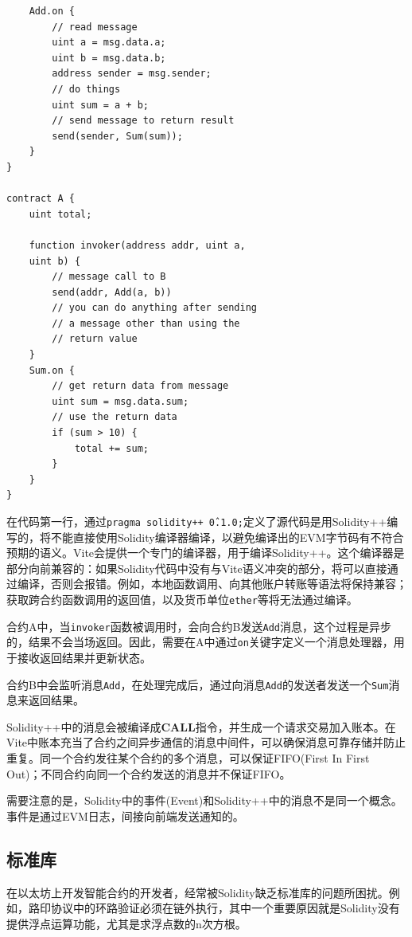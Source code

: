 \documentclass[UTF8,nofonts]{ctexart}
\begin{document}
\begin{multicols}{2}
\begin{verbatim}
    Add.on {
        // read message
        uint a = msg.data.a;
        uint b = msg.data.b;
        address sender = msg.sender;
        // do things 
        uint sum = a + b;
        // send message to return result
        send(sender, Sum(sum));
    }
}

contract A {
    uint total;    
   
    function invoker(address addr, uint a,
    uint b) {
        // message call to B
        send(addr, Add(a, b))        
        // you can do anything after sending
        // a message other than using the 
        // return value
    }
    Sum.on {
        // get return data from message
        uint sum = msg.data.sum;
        // use the return data
        if (sum > 10) {
            total += sum;
        }
    }
}
\end{verbatim}

在代码第一行，通过\texttt{pragma solidity++ \^0.1.0;}定义了源代码是用Solidity++编写的，将不能直接使用Solidity编译器编译，以避免编译出的EVM字节码有不符合预期的语义。Vite会提供一个专门的编译器，用于编译Solidity++。这个编译器是部分向前兼容的：如果Solidity代码中没有与Vite语义冲突的部分，将可以直接通过编译，否则会报错。例如，本地函数调用、向其他账户转账等语法将保持兼容；获取跨合约函数调用的返回值，以及货币单位\texttt{ether}等将无法通过编译。

合约A中，当\texttt{invoker}函数被调用时，会向合约B发送\texttt{Add}消息，这个过程是异步的，结果不会当场返回。因此，需要在A中通过\texttt{on}关键字定义一个消息处理器，用于接收返回结果并更新状态。

合约B中会监听消息\texttt{Add}，在处理完成后，通过向消息\texttt{Add}的发送者发送一个\texttt{Sum}消息来返回结果。

Solidity++中的消息会被编译成\textbf{CALL}指令，并生成一个请求交易加入账本。在Vite中账本充当了合约之间异步通信的消息中间件，可以确保消息可靠存储并防止重复。同一个合约发往某个合约的多个消息，可以保证FIFO(First In First Out)；不同合约向同一个合约发送的消息并不保证FIFO。

需要注意的是，Solidity中的事件(Event)和Solidity++中的消息不是同一个概念。事件是通过EVM日志，间接向前端发送通知的。

\subsection{标准库}
在以太坊上开发智能合约的开发者，经常被Solidity缺乏标准库的问题所困扰。例如，路印协议中的环路验证必须在链外执行，其中一个重要原因就是Solidity没有提供浮点运算功能，尤其是求浮点数的n次方根\cite{loopring}。


\end{multicols}
\end{document}
